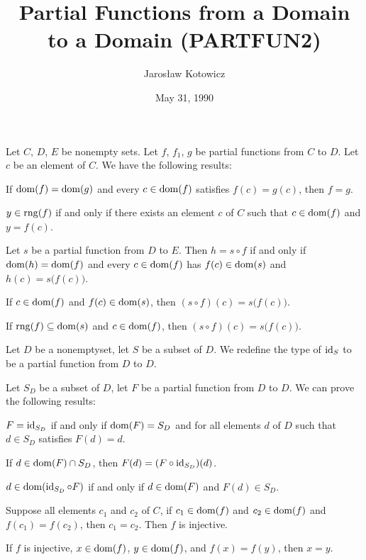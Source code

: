 \documentclass{article}
\title{Partial Functions from a Domain to a Domain (PARTFUN2)}
\author{Jaros{\l}aw Kotowicz}
\date{May 31, 1990}
\begin{document}
\maketitle

Let $C$, $D$, $E$ be nonempty sets. Let $f$, $f_{1}$, $g$ be partial
functions from $C$ to $D$. Let $c$ be an element of $C$.
We have the following results:
\begin{thm}
\item\label{partfun2:1} If $\operatorname{dom}(f)=\operatorname{dom}(g)$ and every $c\in\operatorname{dom}(f)$
  satisfies $f(c)=g(c)$, then $f=g$.
\item\label{partfun2:2} $y\in\operatorname{rng}(f)$ if and only if there exists an
  element $c$ of $C$ such that $c\in\operatorname{dom}(f)$ and $y=f(c)$.
\item\label{partfun2:3} Let $s$ be a partial function from $D$ to $E$.
  Then $h=s\circ f$ if and only if $\operatorname{dom}(h)=\operatorname{dom}(f)$ and every
  $c\in\operatorname{dom}(f)$ has $f(c)\in\operatorname{dom}(s)$ and $h(c)=s\bigl(f(c)\bigr)$.
\item\label{partfun2:4} If $c\in\operatorname{dom}(f)$ and $f(c)\in\operatorname{dom}(s)$,
  then $(s\circ f)(c)=s\bigl(f(c)\bigr)$.
\item\label{partfun2:5} If $\operatorname{rng}(f)\subseteq\operatorname{dom}(s)$ and $c\in\operatorname{dom}(f)$,
  then $(s\circ f)(c)=s\bigl(f(c)\bigr)$.
\end{thm}

\begin{definition}
Let $D$ be a nonemptyset, let $S$ be a subset of $D$.
We redefine the type of $\operatorname{id}_{S}$ to be a partial function from $D$ to $D$.
\end{definition}

Let $S_{D}$ be a subset of $D$, let $F$ be a partial function from $D$
to $D$.
We can prove the following results:
\begin{thm}
\item\label{partfun2:6} $F=\operatorname{id}_{S_{D}}$ if and only if $\operatorname{dom}(F)=S_{D}$
  and for all elements $d$ of $D$ such that $d\in S_{D}$ satisfies $F(d)=d$.
\item\label{partfun2:7} If $d\in\operatorname{dom}(F)\cap S_{D}$, then $F(d)=(F\circ\operatorname{id}_{S_{D}})(d)$.
\item\label{partfun2:8} $d\in\operatorname{dom}(\operatorname{id}_{S_{D}}\circ F)$ if and only if
  $d\in\operatorname{dom}(F)$ and $F(d)\in S_{D}$.
\item\label{partfun2:9} Suppose all elements $c_{1}$ and $c_{2}$ of $C$,
  if $c_{1}\in\operatorname{dom}(f)$ and $c_{2}\in\operatorname{dom}(f)$ and $f(c_{1})=f(c_{2})$,
  then $c_{1}=c_{2}$.
  Then $f$ is injective.
\item\label{partfun2:10} If $f$ is injective, $x\in\operatorname{dom}(f)$,
  $y\in\operatorname{dom}(f)$, and $f(x)=f(y)$, then $x=y$.
\end{thm}
\end{document}
